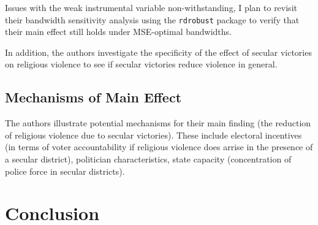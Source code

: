 \documentclass{scrartcl}
\begin{document}
Issues with the weak instrumental variable non-withstanding, I plan to revisit their bandwidth sensitivity analysis using the \texttt{rdrobust} package to verify that their main effect still holds under MSE-optimal bandwidths.

In addition, the authors investigate the specificity of the effect of secular victories on religious violence to see if secular victories reduce violence in general. 

\subsection{Mechanisms of Main Effect}

The authors illustrate potential mechanisms for their main finding (the reduction of religious violence due to secular victories). These include electoral incentives (in terms of voter accountability if religious violence does arrise in the presence of a secular district), politician characteristics, state capacity (concentration of police force in secular districts).

\section{Conclusion}



\end{document}
